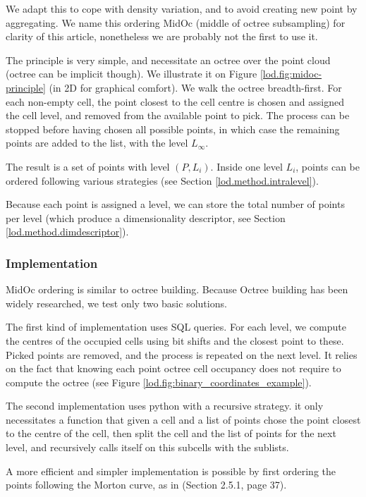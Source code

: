 		We adapt this to cope with density variation, and to avoid creating new point by aggregating.   
		We name this ordering MidOc (middle of octree subsampling) for clarity of this article, nonetheless we are probably not the first to use it.
		
		The principle is very simple, and necessitate an octree over the point cloud (octree can be implicit though).
		We illustrate it on Figure \ref{lod.fig:midoc-principle} (in 2D for graphical comfort).
		We walk the octree breadth-first.
		For each non-empty cell, the point closest to the cell centre is chosen and assigned the cell level,
		and removed from the available point to pick.
		The process can be stopped before having chosen all possible points,
		in which case the remaining points are added to the list, with the level $L_\infty$.
		
		The result is a set of points with level $(P,L_i)$.
		Inside one level $L_i$, points can be ordered following various strategies (see Section \ref{lod.method.intralevel}).
		
		Because each point is assigned a level, we can store the total number of points per level (which produce a dimensionality descriptor, see Section \ref{lod.method.dimdescriptor}).
		
		\subsubsection{Implementation}
		\label{lod.method.midoc.implementation}
		MidOc ordering is similar to octree building. Because Octree building has been widely researched, we test only two basic solutions.
		
		The first kind of implementation uses SQL queries. For each level, we compute the centres of the occupied cells using bit shifts and the closest point to these. Picked points are removed, and the process is repeated on the next level.
		It relies on the fact that knowing each point octree cell occupancy does not require to compute the octree (see Figure \ref{lod.fig:binary_coordinates_example}).
		
		The second implementation uses python with a recursive strategy. it only necessitates a function that given a cell and a list of points chose the point closest to the centre of the cell, then split the cell and the list of points for the next level, and recursively calls itself on this subcells with the sublists.
		
		A more efficient and simpler implementation is possible by first ordering the points following the Morton curve, as  in \cite{Feng2014} (Section 2.5.1, page 37). 
		
